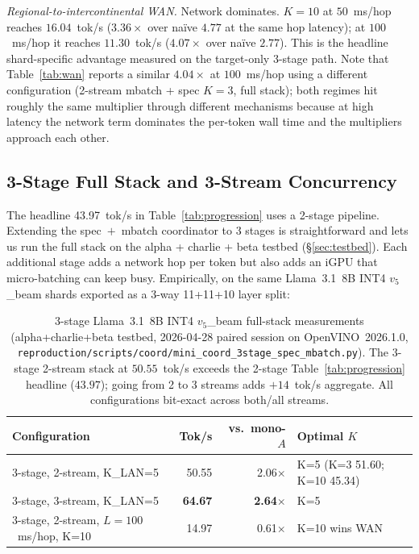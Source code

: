 \documentclass[11pt]{article}
\newcommand{\brk}{\discretionary{}{}{}}
\begin{document}
\textit{Regional-to-intercontinental WAN.} Network dominates. $K\!=\!10$ at $50$~ms/hop reaches $16.04$~tok/s ($3.36\times$ over naïve $4.77$ at the same hop latency); at $100$~ms/hop it reaches $11.30$~tok/s ($4.07\times$ over naïve $2.77$). This is the headline shard-specific advantage measured on the target-only 3-stage path. Note that Table~\ref{tab:wan} reports a similar $4.04\times$ at $100$~ms/hop using a different configuration (2-stream mbatch + spec $K\!=\!3$, full stack); both regimes hit roughly the same multiplier through different mechanisms because at high latency the network term dominates the per-token wall time and the multipliers approach each other.

\subsection{3-Stage Full Stack and 3-Stream Concurrency}
\label{sec:3stage_full}

The headline 43.97~tok/s in Table~\ref{tab:progression} uses a 2-stage pipeline. Extending the spec~$+$~mbatch coordinator to 3 stages is straightforward and lets us run the full stack on the alpha + charlie + beta testbed (\S\ref{sec:testbed}). Each additional stage adds a network hop per token but also adds an iGPU that micro-batching can keep busy. Empirically, on the same Llama~3.1~8B INT4 $v_5$\_beam shards exported as a 3-way 11+11+10 layer split:

\begin{table}[ht]
\centering
\caption{3-stage Llama~3.1~8B INT4 $v_5$\_beam full-stack measurements (alpha+charlie+beta testbed, 2026-04-28 paired session on OpenVINO~2026.1.0, \texttt{reproduction/\brk scripts/\brk coord/\brk mini\_\brk coord\_\brk 3stage\_\brk spec\_\brk mbatch.py}). The 3-stage 2-stream stack at $50.55$~tok/s exceeds the 2-stage Table~\ref{tab:progression} headline ($43.97$); going from 2 to 3 streams adds $+14$~tok/s aggregate. All configurations bit-exact across both/all streams.}
\label{tab:progression_3stage}
\small
\begin{tabular}{@{}lrrl@{}}
\toprule
Configuration & Tok/s & vs.\ mono-$A$ & Optimal $K$ \\
\midrule
3-stage, 2-stream, K\_LAN=5 & 50.55 & 2.06$\times$ & K=5 (K=3 51.60; K=10 45.34) \\
3-stage, 3-stream, K\_LAN=5 & \textbf{64.67} & \textbf{2.64$\times$} & K=5 \\
3-stage, 2-stream, $L\!=\!100$~ms/hop, K=10 & 14.97 & 0.61$\times$ & K=10 wins WAN \\
\bottomrule
\end{tabular}
\end{table}
\end{document}
